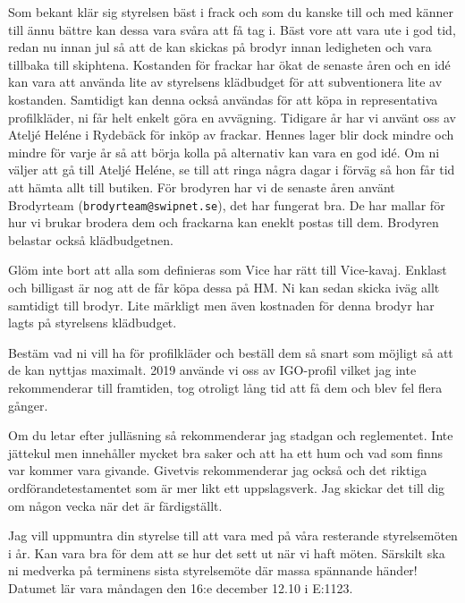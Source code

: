 \documentclass[10pt]{article}
\begin{document}
\begin{numplist}
    \item Som bekant klär sig styrelsen bäst i frack och som du kanske till och med känner till ännu bättre kan dessa vara svåra att få tag i. Bäst vore att vara ute i god tid, redan nu innan jul så att de kan skickas på brodyr innan ledigheten och vara tillbaka till skiphtena. Kostanden för frackar har ökat de senaste åren och en idé kan vara att använda lite av styrelsens klädbudget för att subventionera lite av kostanden. Samtidigt kan denna också användas för att köpa in representativa profilkläder, ni får helt enkelt göra en avvägning. Tidigare år har vi använt oss av Ateljé Heléne i Rydebäck för inköp av frackar. Hennes lager blir dock mindre och mindre för varje år så att börja kolla på alternativ kan vara en god idé. Om ni väljer att gå till Ateljé Heléne, se till att ringa några dagar i förväg så hon får tid att hämta allt till butiken. För brodyren har vi de senaste åren använt Brodyrteam (\texttt{brodyrteam@swipnet.se}), det har fungerat bra. De har mallar för hur vi brukar brodera dem och frackarna kan eneklt postas till dem. Brodyren belastar också klädbudgetnen.

    \item Glöm inte bort att alla som definieras som Vice har rätt till Vice-kavaj. Enklast och billigast är nog att de får köpa dessa på HM. Ni kan sedan skicka iväg allt samtidigt till brodyr. Lite märkligt men även kostnaden för denna brodyr har lagts på styrelsens klädbudget. 
    
    \item Bestäm vad ni vill ha för profilkläder och beställ dem så snart som möjligt så att de kan nyttjas maximalt. 2019 använde vi oss av IGO-profil vilket jag inte rekommenderar till framtiden, tog otroligt lång tid att få dem och blev fel flera gånger.
    
    \item Om du letar efter julläsning så rekommenderar jag stadgan och reglementet. Inte jättekul men innehåller mycket bra saker och att ha ett hum och vad som finns var kommer vara givande. Givetvis rekommenderar jag också och det riktiga ordförandetestamentet som är mer likt ett uppslagsverk. Jag skickar det till dig om någon vecka när det är färdigställt.
    
    \item Jag vill uppmuntra din styrelse till att vara med på våra resterande styrelsemöten i år. Kan vara bra för dem att se hur det sett ut när vi haft möten. Särskilt ska ni medverka på terminens sista styrelsemöte där massa spännande händer! Datumet lär vara måndagen den 16:e december 12.10 i E:1123.
    

\end{numplist}
\end{document}
